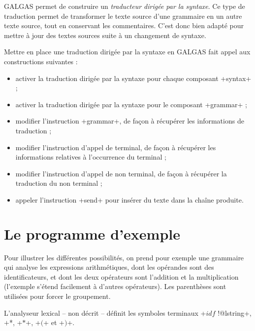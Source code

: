 

GALGAS permet de construire un \emph{traducteur dirigée par la syntaxe}. Ce type de traduction permet de transformer le texte source d'une grammaire en un autre texte source, tout en conservant les commentaires. C'est donc bien adapté pour mettre à jour des textes sources suite à un changement de syntaxe.

Mettre en place une traduction dirigée par la syntaxe en GALGAS fait appel aux constructions suivantes :
\begin{itemize}
  \item activer la traduction dirigée par la syntaxe pour chaque composant \ggs+syntax+ ;
  \item activer la traduction dirigée par la syntaxe pour le composant \ggs+grammar+ ;
  \item modifier l'instruction \ggs+grammar+, de façon à récupérer les informations de traduction ;
  \item modifier l'instruction d'appel de terminal, de façon à récupérer les informations relatives à l'occurrence du terminal ;
  \item modifier l'instruction d'appel de non terminal, de façon à récupérer la traduction du non terminal ;
  \item appeler l'instruction \ggs+send+ pour insérer du texte dans la chaîne produite.
\end{itemize}








\section{Le programme d'exemple}

Pour illustrer les différentes possibilités, on prend pour exemple une grammaire qui analyse les expressions arithmétiques, dont les opérandes sont des identificateurs, et dont les deux opérateurs sont l'addition et la multiplication (l'exemple s'étend facilement à d'autres opérateurs). Les parenthèses sont utilisées pour forcer le groupement.

L'analyseur lexical -- non décrit -- définit les symboles terminaux \ggs+$idf$ !@lstring+, \ggs*$+$*, \ggs+$*$+, \ggs+$($+ et \ggs+$)$+.

